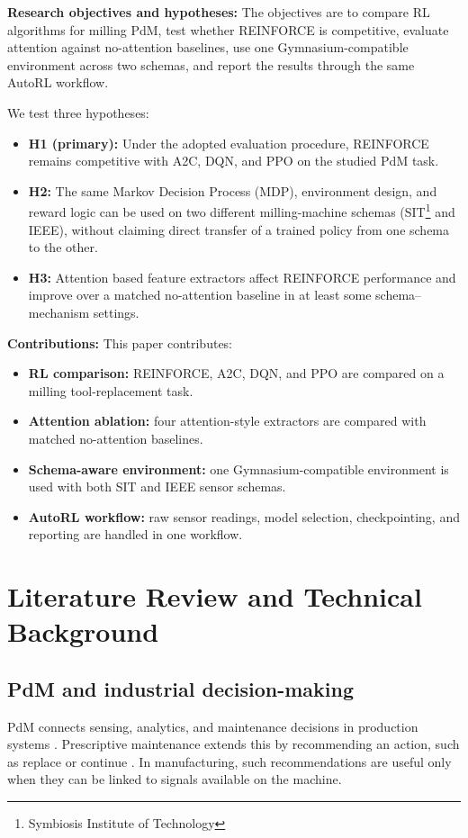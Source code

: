\documentclass[sn-basic]{sn-jnl}%
\begin{document}
\textbf{Research objectives and hypotheses:}
The objectives are to compare RL algorithms for milling PdM, test whether \textsc{REINFORCE} is competitive, evaluate attention against no-attention baselines, use one Gymnasium-compatible environment across two schemas, and report the results through the same AutoRL workflow.

We test three hypotheses:
\begin{itemize}
    \item \textbf{H1 (primary):} Under the adopted evaluation procedure, \textsc{REINFORCE} remains competitive with \textsc{A2C}, \textsc{DQN}, and \textsc{PPO} on the studied PdM task.
    \item \textbf{H2:} The same Markov Decision Process (MDP), environment design, and reward logic can be used on two different milling-machine schemas (SIT\footnote{Symbiosis Institute of Technology} and IEEE), without claiming direct transfer of a trained policy from one schema to the other.
    \item \textbf{H3:} Attention based feature extractors affect \textsc{REINFORCE} performance and improve over a matched no-attention baseline in at least some schema--mechanism settings.
\end{itemize}

\textbf{Contributions:}
This paper contributes:
\begin{itemize}
    \item \textbf{RL comparison:} \textsc{REINFORCE}, \textsc{A2C}, \textsc{DQN}, and \textsc{PPO} are compared on a milling tool-replacement task.
    \item \textbf{Attention ablation:} four attention-style extractors are compared with matched no-attention baselines.
    \item \textbf{Schema-aware environment:} one Gymnasium-compatible environment is used with both SIT and IEEE sensor schemas.
    \item \textbf{AutoRL workflow:} raw sensor readings, model selection, checkpointing, and reporting are handled in one workflow.
\end{itemize}

\section{Literature Review and Technical Background}
\label{sec:lit_tech}
\subsection{PdM and industrial decision-making}
PdM connects sensing, analytics, and maintenance decisions in production systems \cite{Compare2020, Zonta2020}. Prescriptive maintenance extends this by recommending an action, such as replace or continue \cite{Ansari2019}. In manufacturing, such recommendations are useful only when they can be linked to signals available on the machine.
\end{document}
